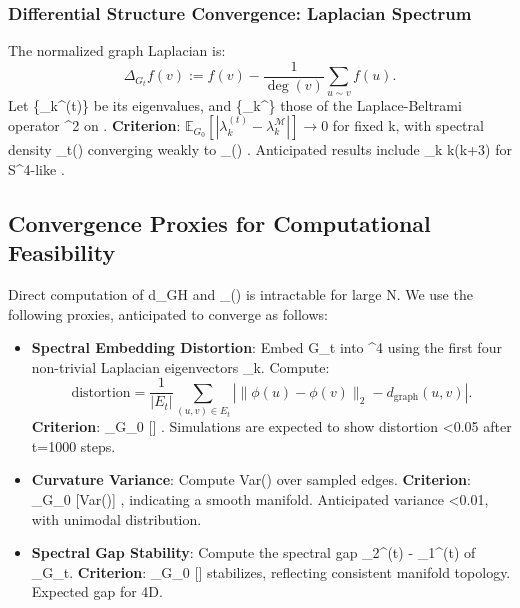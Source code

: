 \documentclass[11pt, a4paper]{article}
\begin{document}
\subsubsection{Differential Structure Convergence: Laplacian Spectrum}
The normalized graph Laplacian is:
\[
\Delta_{G_t} f(v) := f(v) - \frac{1}{\deg(v)} \sum_{u \sim v} f(u).
\]
Let \{\lambda_k^{(t)}\} be its eigenvalues, and \{\lambda_k^{}\} those of the Laplace-Beltrami operator \nabla^2 on . \textbf{Criterion}: \(\mathbb{E}_{G_0} [ |\lambda_k^{(t)} - \lambda_k^{\mathcal{M}}| ] \to 0\) for fixed k, with spectral density \rho_t(\lambda) converging weakly to \rho_{}(\lambda) \cite{belkin2008}. Anticipated results include \lambda_k \propto k(k+3) for S^4-like .

\subsection{Convergence Proxies for Computational Feasibility}
Direct computation of d_GH and \rho_{}(\kappa) is intractable for large N. We use the following proxies, anticipated to converge as follows:

\begin{itemize}
  \item \textbf{Spectral Embedding Distortion}: Embed G_t into ^4 using the first four non-trivial Laplacian eigenvectors \phi_k. Compute:
  \[
  \text{distortion} = \frac{1}{|E_t|} \sum_{(u,v) \in E_t} \left| \|\phi(u) - \phi(v)\|_2 - d_{\text{graph}}(u,v) \right|.
  \]
  \textbf{Criterion}: _{G_0} [] . Simulations are expected to show distortion <0.05 after t=1000 steps.

  \item \textbf{Curvature Variance}: Compute Var(\kappa) over sampled edges. \textbf{Criterion}: _{G_0} [Var(\kappa)] , indicating a smooth manifold. Anticipated variance <0.01, with unimodal distribution.

  \item \textbf{Spectral Gap Stability}: Compute the spectral gap \lambda_2^{(t)} - \lambda_1^{(t)} of \Delta_{G_t}. \textbf{Criterion}: _{G_0} [] stabilizes, reflecting consistent manifold topology. Expected gap  for 4D.
\end{itemize}
\end{document}
